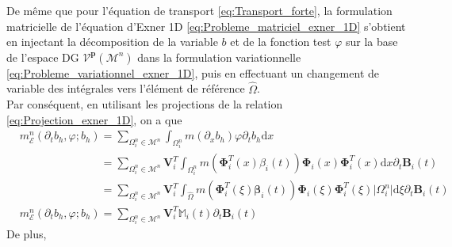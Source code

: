 \documentclass[11pt, a4paper, oneside]{report}
\begin{document}
De même que pour l'équation de transport \eqref{eq:Transport_forte}, la formulation matricielle de l'équation d'Exner 1D \eqref{eq:Probleme_matriciel_exner_1D} s'obtient en injectant la décomposition de la variable $b$ et de la fonction test $\varphi$ sur la base de l'espace DG $\mathcal{V}^\mathbf{p}(\mathcal{M}^n)$ dans la formulation variationnelle \eqref{eq:Probleme_variationnel_exner_1D}, puis en effectuant un changement de variable des intégrales vers l'élément de référence $\widehat{\Omega}$. \\
Par conséquent, en utilisant les projections de la relation \eqref{eq:Projection_exner_1D}, on a que
\begin{equation}
    \begin{aligned}
        &m_\mathcal{E}^n(\partial_t b_h, \varphi; b_h) = \sum_{\Omega_i^n \in \mathcal{M}^n} \int_{\Omega_i^n} m(\partial_x b_h) \varphi \partial_t b_h \text{d}x \\
        &\phantom{m_\mathcal{E}^n(\partial_t b_h, \varphi; b_h) } = \sum_{\Omega_i^n \in \mathcal{M}^n} \bm{V}_i^T \int_{\Omega_i^n} m \left( \bm{\Phi}_i^T(x) \beta_i(t) \right) \bm{\Phi}_i(x) \bm{\Phi}_i^T(x) \text{d}x \partial_t \bm{B}_i(t) \\
        &\phantom{m_\mathcal{E}^n(\partial_t b_h, \varphi; b_h) } = \sum_{\Omega_i^n \in \mathcal{M}^n} \bm{V}_i^T \int_{\widehat{\Omega}} m \left( \bm{\Phi}_i^T(\xi) \bm{\beta}_i(t) \right) \bm{\Phi}_i(\xi) \bm{\Phi}_i^T(\xi) \lvert \Omega_i^n \rvert \text{d}\xi \partial_t \bm{B}_i(t) \\
        &m_\mathcal{E}^n(\partial_t b_h, \varphi; b_h) = \sum_{\Omega_i^n \in \mathcal{M}^n} \bm{V}_i^T \mathbb{M}_i(t) \partial_t \bm{B}_i(t)
    \end{aligned}
\end{equation}
De plus,
\end{document}
